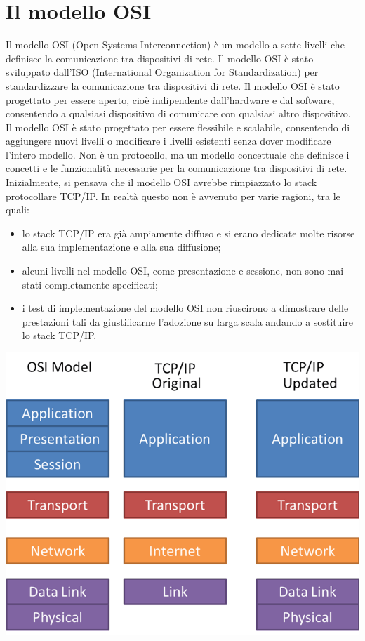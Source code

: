 \documentclass[12pt]{report}
\begin{document}
	\section{Il modello OSI}
	Il modello OSI (Open Systems Interconnection) è un modello a sette livelli che definisce la comunicazione tra dispositivi di rete. Il modello OSI è stato sviluppato dall'ISO (International Organization for Standardization) per standardizzare la comunicazione tra dispositivi di rete. Il modello OSI è stato progettato per essere aperto, cioè indipendente dall'hardware e dal software, consentendo a qualsiasi dispositivo di comunicare con qualsiasi altro dispositivo. Il modello OSI è stato progettato per essere flessibile e scalabile, consentendo di aggiungere nuovi livelli o modificare i livelli esistenti senza dover modificare l'intero modello. Non è un protocollo, ma un modello concettuale che definisce i concetti e le funzionalità necessarie per la comunicazione tra dispositivi di rete.
	\vspace{\baselineskip}\\
	Inizialmente, si pensava che il modello OSI avrebbe rimpiazzato lo stack protocollare TCP/IP. In realtà questo non è avvenuto per varie ragioni, tra le quali:
	\begin{itemize}
		\item lo stack TCP/IP era già ampiamente diffuso e si erano dedicate molte risorse alla sua implementazione e alla sua diffusione;
		\item alcuni livelli nel modello OSI, come presentazione e sessione, non sono mai stati completamente specificati;
		\item i test di implementazione del modello OSI non riuscirono a dimostrare delle prestazioni tali da giustificarne l'adozione su larga scala andando a sostituire lo stack TCP/IP. 
	\end{itemize}
	\begin{center}
		\includegraphics[scale=0.24]{assets/isoosi-vs-tcpip.png}
	\end{center}
\end{document}
